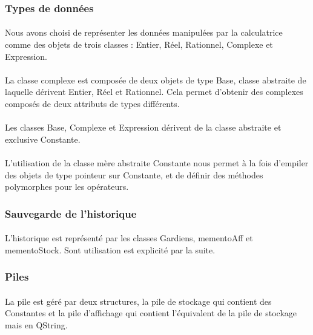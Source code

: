 \documentclass[a4paper,12pt]{article}
\begin{document}
		\subsubsection{Types de données}
			\paragraph{}Nous avons choisi de représenter les données manipulées par la calculatrice comme des objets de trois classes : Entier, Réel, Rationnel, Complexe et Expression. 

			\paragraph{}La classe complexe est composée de deux objets de type Base, classe abstraite de laquelle dérivent Entier, Réel et Rationnel. Cela permet d'obtenir des complexes composés de deux attributs de types différents.

			\paragraph{}Les classes Base, Complexe et Expression dérivent de la classe abstraite et exclusive Constante. 

			\paragraph{}L'utilisation de la classe mère abstraite Constante nous permet à la fois d'empiler des objets de type pointeur sur Constante, et de définir des méthodes polymorphes pour les opérateurs. 

		\subsubsection{Sauvegarde de l'historique}
	 		\paragraph{}L'historique est représenté par les classes Gardiens, mementoAff et mementoStock. Sont utilisation est explicité par la suite.
		\subsubsection{Piles}
			\paragraph{} La pile est géré par deux structures, la pile de stockage qui contient des Constantes et la pile d'affichage qui contient l'équivalent de la pile de stockage mais en QString.
		
\end{document}
